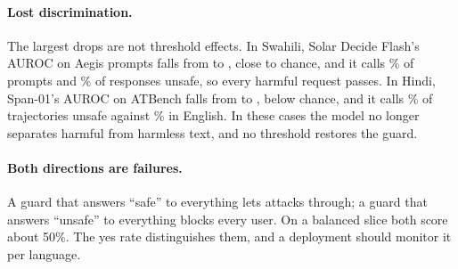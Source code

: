 \paragraph{Lost discrimination.} The largest drops are not threshold effects.
In Swahili, Solar Decide Flash's AUROC on Aegis prompts falls from
\MLaucEnSolarDecideFlashSWAegisPrompts{} to \MLaucSolarDecideFlashSWAegisPrompts{},
close to chance, and it calls \MLyesSolarDecideFlashSWAegisPrompts\% of prompts
and \MLyesSolarDecideFlashSWAegisResponses\% of responses unsafe, so every
harmful request passes. In Hindi, Span-01's AUROC on ATBench falls from
\MLaucEnSpanHIAtbench{} to \MLaucSpanHIAtbench{}, below chance, and it calls
\MLyesSpanHIAtbench\% of trajectories unsafe against \MLyesEnSpanHIAtbench\% in
English. In these cases the model no longer separates harmful from harmless
text, and no threshold restores the guard.

\paragraph{Both directions are failures.} A guard that answers ``safe'' to
everything lets attacks through; a guard that answers ``unsafe'' to everything
blocks every user. On a balanced slice both score about 50\%. The yes rate
distinguishes them, and a deployment should monitor it per language.
